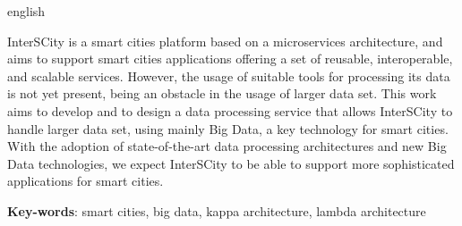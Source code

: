 \begin{resumo}[Abstract]
 \begin{otherlanguage*}{english}

     InterSCity is a smart cities platform based on a microservices
     architecture, and aims to support smart cities applications offering a
     set of reusable, interoperable, and scalable services. However, the usage
     of suitable tools for processing its data is not yet present, being an
     obstacle in the usage of larger data set. This work aims to develop and to
     design a data processing service that allows InterSCity to handle larger
     data set, using mainly Big Data, a key technology for smart cities. With
     the adoption of state-of-the-art data processing architectures and new
     Big Data technologies, we expect InterSCity to be able to support
     more sophisticated applications for smart cities.

   \vspace{\onelineskip}
 
   \noindent 
   \textbf{Key-words}: smart cities, big data, kappa architecture, lambda architecture
 \end{otherlanguage*}
\end{resumo}

